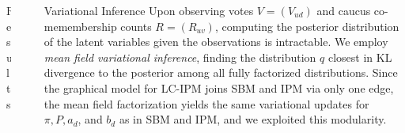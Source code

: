 \documentclass[final]{beamer}
\newlength{\sepwid}
\newlength{\onecolwid}
\newlength{\twocolwid}
\begin{document}
\begin{frame}[t]
\begin{columns}[t]
\begin{column}{\twocolwid}
\begin{block}{Results}


\end{block}


\end{column} %

\begin{column}{\sepwid}\end{column} %

\begin{column}{\onecolwid} %


\begin{block}{Variational Inference}
Upon observing votes $V = (V_{ud})$ and caucus co-memembership counts $R = (R_{uv})$, computing the posterior distribution of the latent variables given the observations is intractable. We employ {\sl mean field variational inference}, finding the distribution $q$ closest in KL divergence to the posterior among all fully factorized distributions. Since the graphical model for LC-IPM joins SBM and IPM via only one edge, the mean field factorization yields the same variational updates for $\pi, P, a_d$, and $b_d$ as in SBM and IPM, and we exploited this modularity.%


\end{block}
\end{column}
\end{columns}
\end{frame}
\end{document}
